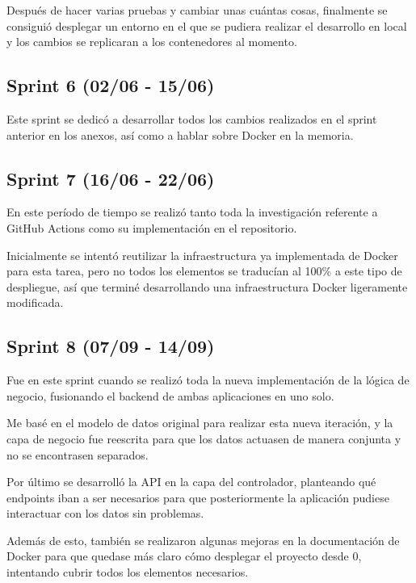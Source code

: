 Después de hacer varias pruebas y cambiar unas cuántas cosas, finalmente se consiguió desplegar un entorno en el que se pudiera realizar el desarrollo en local y los cambios se replicaran a los contenedores al momento.

\subsection{Sprint 6 (02/06 - 15/06)}

Este sprint se dedicó a desarrollar todos los cambios realizados en el sprint anterior en los anexos, así como a hablar sobre Docker en la memoria.


\subsection{Sprint 7 (16/06 - 22/06)}

En este período de tiempo se realizó tanto toda la investigación referente a GitHub Actions como su implementación en el repositorio. 

Inicialmente se intentó reutilizar la infraestructura ya implementada de Docker para esta tarea, pero no todos los elementos se traducían al 100\% a este tipo de despliegue, así que terminé desarrollando una infraestructura Docker ligeramente modificada.


\subsection{Sprint 8 (07/09 - 14/09)}

Fue en este sprint cuando se realizó toda la nueva implementación de la lógica de negocio, fusionando el backend de ambas aplicaciones en uno solo. 

Me basé en el modelo de datos original para realizar esta nueva iteración, y la capa de negocio fue reescrita para que los datos actuasen de manera conjunta y no se encontrasen separados. 

Por último se desarrolló la API en la capa del controlador, planteando qué endpoints iban a ser necesarios para que posteriormente la aplicación pudiese interactuar con los datos sin problemas.

Además de esto, también se realizaron algunas mejoras en la documentación de Docker para que quedase más claro cómo desplegar el proyecto desde 0, intentando cubrir todos los elementos necesarios.


